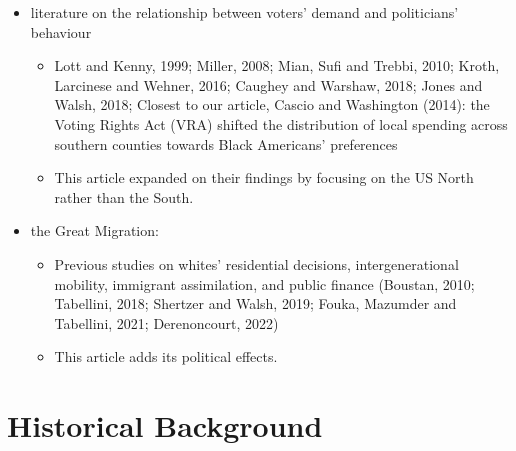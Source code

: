 \documentclass[dvipdfmx,11pt]{beamer}
\begin{document}
\begin{frame}{}
  \begin{itemize}
    \item literature on the relationship between voters' demand and politicians' behaviour
    \begin{itemize}
      \item Lott and Kenny, 1999; Miller, 2008; Mian, Sufi and Trebbi, 2010; Kroth, Larcinese and Wehner, 2016; Caughey and Warshaw, 2018; Jones and Walsh, 2018; Closest to our article, Cascio and Washington (2014): the Voting Rights Act (VRA) shifted the distribution of local spending across southern counties towards Black Americans' preferences
      \item This article expanded on their findings by focusing on the US North rather than the South.
    \end{itemize}
    \item the Great Migration: 
    \begin{itemize}
      \item Previous studies on whites' residential
      decisions, intergenerational mobility, immigrant assimilation, and public finance (Boustan, 2010; Tabellini, 2018; Shertzer and Walsh, 2019; Fouka, Mazumder and Tabellini, 2021; Derenoncourt, 2022)
      \item This article adds its political effects.
    \end{itemize}
  \end{itemize}
\end{frame}

\section{Historical Background}
\frame{\sectionpage}
\end{document}
